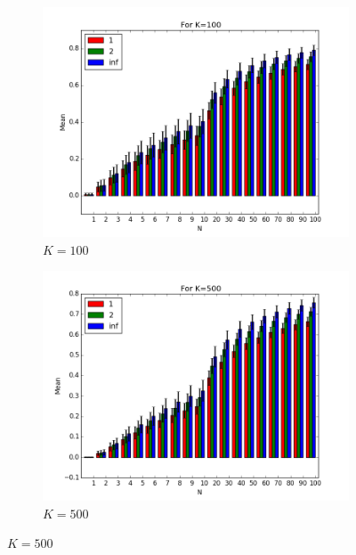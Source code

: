 \documentclass{article}
\begin{document}
\begin{figure}[H]
    \centering
    \begin{subfigure}[h]{0.75\textwidth}
        \includegraphics[width=\textwidth]{experiment1-1-100.png}
        \caption{$K=100$}
        \label{fig:exp1k100}
    \end{subfigure}
   \begin{subfigure}[h]{0.75\textwidth}
        \includegraphics[width=\textwidth]{experiment1-1-500.png}
        \caption{$K=500$}
        \label{fig:exp11k500}
    \end{subfigure}
\end{figure}
\end{document}
